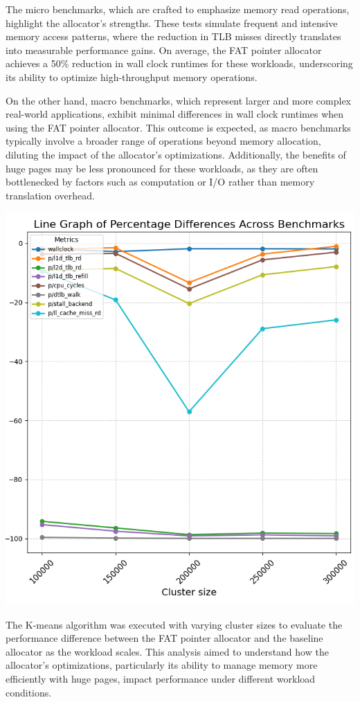 \documentclass[11pt]{article}
\begin{document}
The micro benchmarks, which are crafted to emphasize memory read operations, highlight the 
allocator's strengths. These tests simulate frequent and intensive memory access patterns, 
where the reduction in TLB misses directly translates into measurable performance gains. 
On average, the FAT pointer allocator achieves a 50\% reduction in wall clock runtimes for 
these workloads, underscoring its ability to optimize high-throughput memory operations.

On the other hand, macro benchmarks, which represent larger and more complex real-world applications, 
exhibit minimal differences in wall clock runtimes when using the FAT pointer allocator. 
This outcome is expected, as macro benchmarks typically involve a broader range of operations 
beyond memory allocation, diluting the impact of the allocator's optimizations. Additionally, 
the benefits of huge pages may be less pronounced for these workloads, as they are often 
bottlenecked by factors such as computation or I/O rather than memory translation overhead.

\begin{center}
\includegraphics[width=.9\linewidth]{./diagrams/kmeans.png}
\end{center}

The K-means algorithm was executed with varying cluster sizes to evaluate the performance difference 
between the FAT pointer allocator and the baseline allocator as the workload scales. This analysis 
aimed to understand how the allocator's optimizations, particularly its ability to manage memory 
more efficiently with huge pages, impact performance under different workload conditions.
\end{document}
